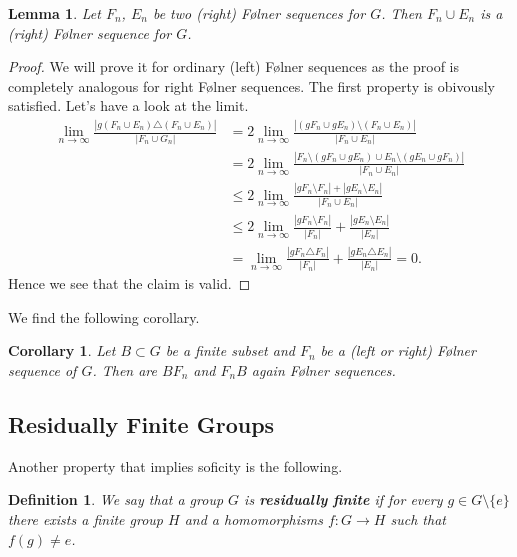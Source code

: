 \documentclass[titlepage, a4paper]{article}
\newcommand{\card}[1]{\left| #1 \right|}
\newtheorem{definition}[theorem]{Definition}
\newtheorem{lemma}[theorem]{Lemma}
\newtheorem{corollary}[theorem]{Corollary}
\theoremstyle{remark}
\begin{document}
\begin{lemma}
	Let $F_n$, $E_n$ be two (right) Følner sequences for $G$. Then $F_n \cup E_n$ is a (right) Følner sequence for $G$.
\end{lemma}
\begin{proof}
	We will prove it for ordinary (left) Følner sequences as the proof is completely analogous for right Følner sequences.
	The first property is obivously satisfied. 
	Let's have a look at the limit.
	\begin{align*}
		\lim_{n \to \infty} \frac{\card{g(F_n \cup E_n) \triangle (F_n \cup E_n)}}{\card{F_n \cup G_n}} &= 2 \lim_{n \to \infty} \frac{\card{(gF_n \cup gE_n)\setminus (F_n \cup E_n)}}{\card{F_n \cup E_n}} \\
														&= 2 \lim_{n \to \infty} \frac{\card{F_n \setminus (gF_n \cup g E_n) \cup E_n\setminus (gE_n \cup gF_n) }}{\card{F_n \cup E_n}} \\
														&\le 2 \lim_{n \to \infty} \frac{\card{gF_n \setminus F_n} + \card{gE_n \setminus E_n}}{\card{F_n \cup E_n}}\\
														&\le 2 \lim_{n \to \infty}  \frac{\card{gF_n \setminus F_n}}{\card{F_n}} + \frac{\card{gE_n \setminus E_n}}{\card{E_n}} \\
														&=  \lim_{n \to \infty} \frac{\card{gF_n \triangle F_n}}{\card{F_n}} +  \frac{\card{gE_n \triangle E_n}}{\card{E_n}}= 0  
	.\end{align*}
	Hence we see that the claim is valid.
\end{proof}
We find the following corollary. 
\begin{corollary}\label{cor:product_folner_sequence}
	Let $B \subset G$ be a finite subset and $F_n$ be a (left or right) Følner sequence of $G$. Then are $BF_n$ and $F_nB$ again Følner sequences.
\end{corollary}


\subsection{Residually Finite Groups}

Another property that implies soficity is the following.

\begin{definition}\cite{noauthor_residually_2018} \label{def:res_fin}
	We say that a group $G$ is \textbf{residually finite} if for every $g \in G\setminus\{e\}$ there exists a finite group $H$ and a homomorphisms $f:G \to H$ such that $f(g) \ne e$.
\end{definition}
\end{document}
